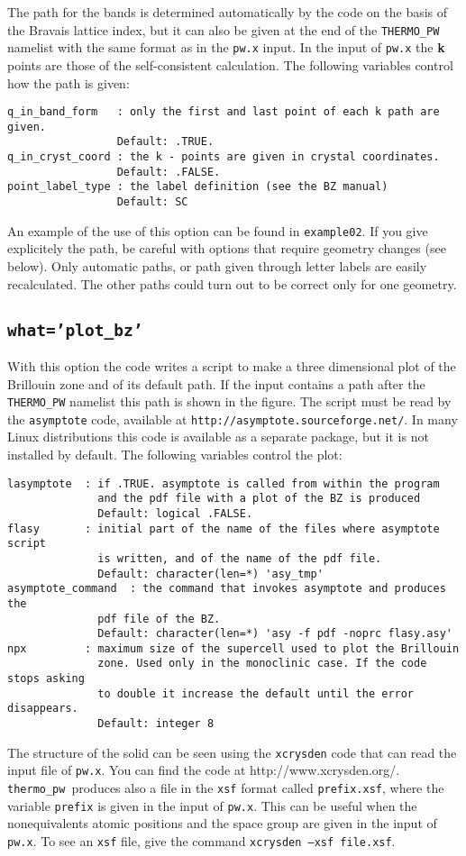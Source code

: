 \documentclass[12pt,a4paper]{article}
\def\thermo{\texttt{thermo\_pw}}
\begin{document}
The path for the bands is determined automatically by the code on the basis
of the Bravais lattice index, but it can also be given at the end of
the \texttt{THERMO\_PW} namelist with the same format as in the \texttt{pw.x}
input. In the input of \texttt{pw.x} the {\bf k} points are those of the
self-consistent calculation. The following variables control how the path
is given:
\begin{verbatim}
q_in_band_form   : only the first and last point of each k path are given.
                 Default: .TRUE.
q_in_cryst_coord : the k - points are given in crystal coordinates.
                 Default: .FALSE.
point_label_type : the label definition (see the BZ manual)
                 Default: SC
\end{verbatim}
An example of the use of this option can be found in \texttt{example02}.
If you give explicitely the path, be careful with options that require
geometry changes (see below). Only automatic paths, or path given through 
letter labels are easily recalculated. The other paths could turn out 
to be correct only for one geometry.

\subsection{\texttt{what='plot\_bz'}}
With this option the code writes a script to make a three dimensional plot
of the Brillouin zone and of its default path. If the input contains a path
after the \texttt{THERMO\_PW} namelist this path is shown in the figure. 
The script must be read by the \texttt{asymptote} code, available at 
\texttt{http://asymptote.sourceforge.net/}. In many Linux distributions
this code is available as a separate package, but it is not installed by
default. The following variables control the plot:
\begin{verbatim}
lasymptote  : if .TRUE. asymptote is called from within the program
              and the pdf file with a plot of the BZ is produced
              Default: logical .FALSE.
flasy       : initial part of the name of the files where asymptote script
              is written, and of the name of the pdf file.
              Default: character(len=*) 'asy_tmp'
asymptote_command  : the command that invokes asymptote and produces the 
              pdf file of the BZ.
              Default: character(len=*) 'asy -f pdf -noprc flasy.asy'
npx         : maximum size of the supercell used to plot the Brillouin
              zone. Used only in the monoclinic case. If the code stops asking
              to double it increase the default until the error disappears.
              Default: integer 8
\end{verbatim}
The structure of the solid can be seen using the \texttt{xcrysden} code
that can read the input file of \texttt{pw.x}. You can find the code at
{http://www.xcrysden.org/}. \thermo\ produces also a file in the
\texttt{xsf} format called \texttt{prefix.xsf}, where the variable 
\texttt{prefix}
is given in the input of \texttt{pw.x}. This can be useful when
the nonequivalents atomic positions and the space group are given in the input
of \texttt{pw.x}. To see an \texttt{xsf} file, give the command
\texttt{xcrysden --xsf file.xsf}.
\end{document}
